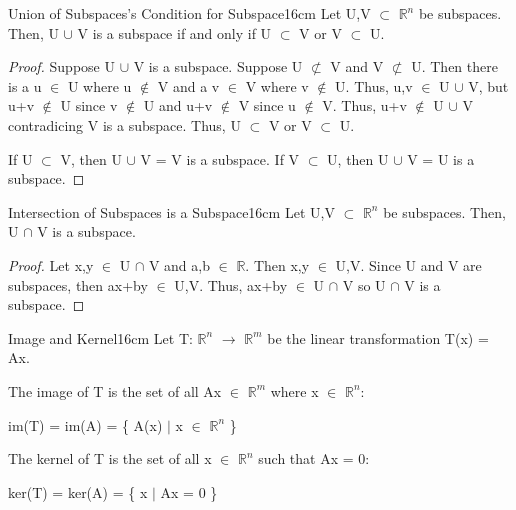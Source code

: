     \vspace{0.5cm}



    \begin{wtheorem}{Union of Subspaces's Condition for Subspace}{16cm}
        Let U,V $\subset$ $\mathbb{R}^n$ be subspaces.
        Then, U $\cup$ V is a subspace if and only if
        U $\subset$ V or V $\subset$ U.
    \end{wtheorem}

    \begin{proof}
        Suppose U $\cup$ V is a subspace.
        Suppose U $\not \subset$ V and V $\not \subset$ U.
        Then there is a u $\in$ U where u $\not \in$ V
        and a v $\in$ V where v $\not \in$ U.
        Thus, u,v $\in$ U $\cup$ V, but u+v $\not \in$ U since
        v $\not \in$ U and u+v $\not \in$ V since u $\not \in$ V.
        Thus, u+v $\not \in$ U $\cup$ V contradicing V is a subspace.
        Thus, U $\subset$ V or V $\subset$ U.

        \vspace{0.2cm}

        If U $\subset$ V, then U $\cup$ V = V is a subspace.
        If V $\subset$ U, then U $\cup$ V = U is a subspace. 
    \end{proof}

    \vspace{0.5cm}



    \begin{wtheorem}{Intersection of Subspaces is a Subspace}{16cm}
        Let U,V $\subset$ $\mathbb{R}^n$ be subspaces.
        Then, U $\cap$ V is a subspace.
    \end{wtheorem}

    \begin{proof}
        Let x,y $\in$ U $\cap$ V and a,b $\in$ $\mathbb{R}$.
        Then x,y $\in$ U,V.
        Since U and V are subspaces, then ax+by $\in$ U,V.
        Thus, ax+by $\in$ U $\cap$ V so U $\cap$ V is a subspace.
    \end{proof}

    \vspace{0.5cm}

    \begin{definition}{Image and Kernel}{16cm}
        Let T: $\mathbb{R}^n$ $\rightarrow$ $\mathbb{R}^m$
        be the linear transformation T(x) = Ax.

        The {\color{lblue} image} of T is the set of all Ax $\in$ $\mathbb{R}^m$
        where x $\in$ $\mathbb{R}^n$:

        \hspace{0.5cm}
        im(T) = im(A) = \{ A(x) $|$ x $\in$ $\mathbb{R}^n$ \}

        The {\color{lblue} kernel} of T is the set of all x $\in$ $\mathbb{R}^n$
        such that Ax = 0:

        \hspace{0.5cm}
        ker(T) = ker(A) = \{ x $|$ Ax = 0 \}
    \end{definition}

